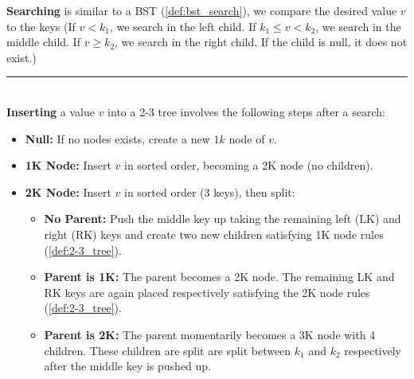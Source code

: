 \begin{Def}

    \label{def:2-3_tree_search_insert}

    \textbf{Searching} is similar to a BST (\ref{def:bst_search}), we compare the desired value $v$ to the keys
    (If $v < k_1$, we search in the left child.
        If $k_1 \leq v < k_2$, we search in the middle child.
        If $v \geq k_2$, we search in the right child.
        If the child is null, it does not exist.)

    \noindent
    \rule{\textwidth}{0.4pt}\\

    \noindent
    \textbf{Inserting} a value $v$ into a 2-3 tree involves the following steps after a search:
    \begin{itemize}
        \item \textbf{Null:} If no nodes exists, create a new $1k$ node of $v$.
        \item \textbf{1K Node:} Insert $v$ in sorted order, becoming a 2K node (no children).
        \item \textbf{2K Node:} Insert $v$ in sorted order (3 keys), then split:
            \begin{itemize}
                \item \textbf{No Parent:} Push the middle key up taking the remaining left (LK) and right (RK) keys and create two new children satisfying 1K node rules (\ref{def:2-3_tree}).
                \item \textbf{Parent is 1K:} The parent becomes a 2K node. The remaining LK and RK keys are again placed
                respectively satisfying the 2K node rules (\ref{def:2-3_tree}).
                \item \textbf{Parent is 2K:} The parent momentarily becomes a 3K node with 4 children. These children are split 
                are split between $k_1$ and $k_2$ respectively after the middle key is pushed up.
            \end{itemize}
    \end{itemize}
\end{Def}

